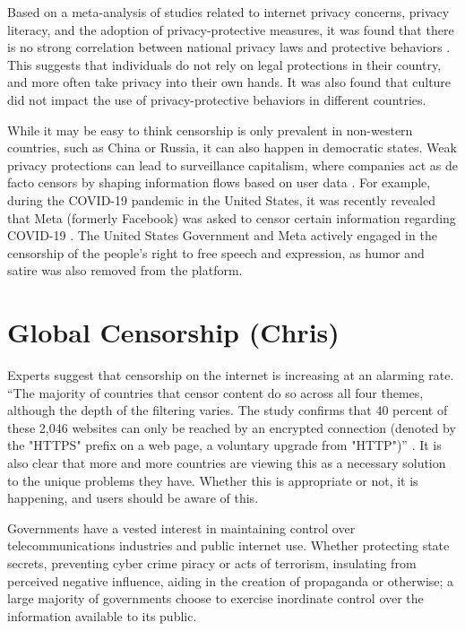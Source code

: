 Based on a meta-analysis of studies related to internet privacy concerns, privacy literacy, and the adoption of privacy-protective measures, it was found that there is no strong correlation between national privacy laws and protective behaviors \cite{baruh2017online}. This suggests that individuals do not rely on legal protections in their country, and more often take privacy into their own hands. It was also found that culture did not impact the use of privacy-protective behaviors in different countries. 

While it may be easy to think censorship is only prevalent in non-western countries, such as China or Russia, it can also happen in democratic states. Weak privacy protections can lead to surveillance capitalism, where companies act as de facto censors by shaping information flows based on user data \cite{schwartz1999internet}. For example, during the COVID-19 pandemic in the United States, it was recently revealed that Meta (formerly Facebook) was asked to censor certain information regarding COVID-19 \cite{pbsZuckerbergSays}. The United States Government and Meta actively engaged in the censorship of the people's right to free speech and expression, as humor and satire was also removed from the platform.

\section{Global Censorship (Chris)}

Experts suggest that censorship on the internet is increasing at an alarming rate. “The majority of countries that censor content do so across all four themes, although the depth of the filtering varies. The study confirms that 40 percent of these 2,046 websites can only be reached by an 
encrypted connection (denoted by the "HTTPS" prefix on a web page, a voluntary upgrade from "HTTP")” \cite{zittrain2017shifting}. It is also clear that more and more countries are viewing this as a necessary solution to the unique problems they have. Whether this is appropriate or not, it is happening, and users should be aware of this. 

Governments have a vested interest in maintaining control over telecommunications industries and public internet use. Whether protecting state secrets, preventing cyber crime piracy or acts of terrorism, insulating from perceived negative influence, aiding in the creation of propaganda or otherwise; a large majority of governments choose to exercise inordinate control over the 
information available to its public.  

